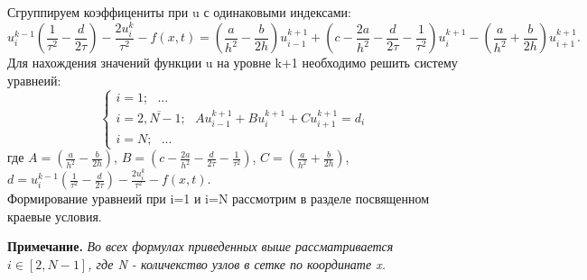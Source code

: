 \documentclass[12pt]{article}
\begin{document}
\begin{enumerate}
\begin{enumerate}
        Сгруппируем коэффицениты при u с одинаковыми индексами:
        $$u_i^{k-1}\left(\frac{1}{\tau^2}-\frac{d}{2\tau}\right)-\frac{2u_i^k}{\tau^2}-f(x,t) = \left(\frac{a}{h^2}-\frac{b}{2h} \right)u_{i-1}^{k+1} + \left(c-\frac{2a}{h^2}-\frac{d}{2\tau}-\frac{1}{\tau^2}\right)u_i^{k+1} -
        \left(\frac{a}{h^2}+\frac{b}{2h}\right)u_{i+1}^{k+1}.$$
        Для нахождения значений функции u на уровне k+1 необходимо решить систему уравнеий:
        \begin{equation*}
            \begin{cases}
                i=1;\:\:\: ...
                \\
                i=\overline{2,N-1};\:\:\:Au_{i-1}^{k+1} + Bu_i^{k+1} +Cu_{i+1}^{k+1}=d_i
                \\
                i=N;\:\:\: ...
            \end{cases}
        \end{equation*}
        где $A = \left(\frac{a}{h^2}-\frac{b}{2h} \right) $, $B = \left(c-\frac{2a}{h^2}-\frac{d}{2\tau}-\frac{1}{\tau^2}\right)$, $C = \left(\frac{a}{h^2}+\frac{b}{2h}\right)$, 
        $d = u_i^{k-1}\left(\frac{1}{\tau^2}-\frac{d}{2\tau}\right)-\frac{2u_i^k}{\tau^2}-f(x,t)$.\\
        Формирование уравнеий при i=1 и i=N рассмотрим в разделе посвященном краевые условия.
    \end{enumerate}
    \textbf{Примечание.}
    \emph{Во всех формулах приведенных выше рассматривается $i \in [2,N-1]$, где N - количекство узлов в сетке по координате x.}


\end{enumerate}
\end{document}
